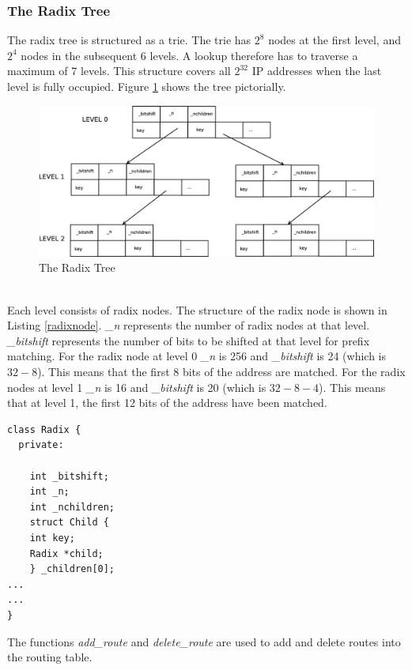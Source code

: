 \documentclass{article}
\begin{document}
\subsubsection{The Radix Tree}
The radix tree is structured as a trie. The trie has  $2^8$ nodes at the first level, and $2^4$ nodes in the subsequent 6 levels. A lookup therefore has to traverse a maximum of 7 levels. This structure covers all $2^{32}$ IP addresses when the last level is fully occupied. Figure \ref{radixtree} shows the tree pictorially.\\
\begin{figure}[tph]
\includegraphics[scale = 0.2]{../images/diagrams/radixtree2.eps}
\caption{The Radix Tree}
\label{radixtree}
\end{figure}
\\Each level consists of radix nodes. The structure of the radix node is shown in Listing \ref{radixnode}. \emph{\_n} represents the number of radix nodes at that level. \emph{\_bitshift} represents the number of bits to be shifted at that level for prefix matching. For the radix node at level 0 \emph{\_n} is 256 and \emph{\_bitshift} is 24 (which is $32 - 8$). This means that the first 8 bits of the address are matched. For the radix nodes at level 1 \emph{\_n} is 16 and \emph{\_bitshift} is 20 (which is $32 -8 -4$). This means that at level 1, the first 12 bits of the address have been matched.
\begin{lstlisting}[float=tph, caption = The Radix Class, label=radixnode]
class Radix {
  private:

    int _bitshift;
    int _n;
    int _nchildren;
    struct Child {
	int key;
	Radix *child;
    } _children[0];
...
...
}
\end{lstlisting}
The functions \emph{add\_route} and \emph{delete\_route} are used to add and delete routes into the routing table.
\end{document}
